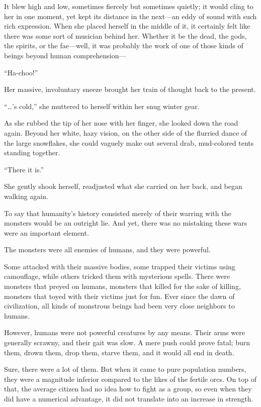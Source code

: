 It blew high and low, sometimes fiercely but sometimes quietly; it would cling to her in one moment, yet kept its distance in the next—an eddy of sound with such rich expression. When she placed herself in the middle of it, it certainly felt like there was some sort of musician behind her. Whether it be the dead, the gods, the spirits, or the fae—well, it was probably the work of one of those kinds of beings beyond human comprehension—

“Ha-choo!”

Her massive, involuntary sneeze brought her train of thought back to the present.

“…’s cold,” she muttered to herself within her snug winter gear.

As she rubbed the tip of her nose with her finger, she looked down the road again. Beyond her white, hazy vision, on the other side of the flurried dance of the large snowflakes, she could vaguely make out several drab, mud-colored tents standing together.

“There it is.”

She gently shook herself, readjusted what she carried on her back, and began walking again.

\icon

To say that humanity’s history consisted merely of their warring with the monsters would be an outright lie. And yet, there was no mistaking these wars were an important element.

The monsters were all enemies of humans, and they were powerful.

Some attacked with their massive bodies, some trapped their victims using camouflage, while others tricked them with mysterious spells. There were monsters that preyed on humans, monsters that killed for the sake of killing, monsters that toyed with their victims just for fun. Ever since the dawn of civilization, all kinds of monstrous beings had been very close neighbors to humans.

However, humans were not powerful creatures by any means. Their arms were generally scrawny, and their gait was slow. A mere push could prove fatal; burn them, drown them, drop them, starve them, and it would all end in death.

Sure, there were a lot of them. But when it came to pure population numbers, they were a magnitude inferior compared to the likes of the fertile orcs. On top of that, the average citizen had no idea how to fight as a group, so even when they did have a numerical advantage, it did not translate into an increase in strength.

